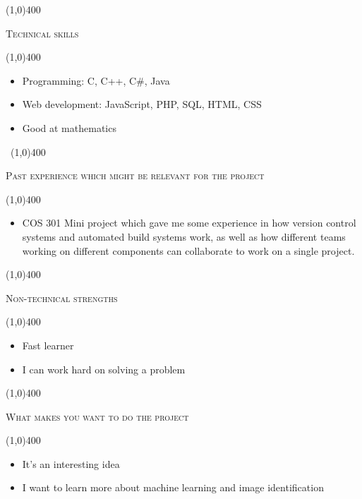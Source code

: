 \documentclass[12pt,a4paper]{report}
\begin{document}
	\begin{center}
	
	\line(1,0){400}\\
	{\scshape\large Technical skills\par}
	\line(1,0){400}\\
	\end{center}
		\begin{itemize}
\item Programming: C, C++, C\#, Java
\item Web development: JavaScript, PHP, SQL, HTML, CSS
\item Good at mathematics
\end{itemize}
\newpage
\begin{center}
	\vspace*{-3cm}\
	\line(1,0){400}\\
	{\scshape\large Past experience which might be relevant for the project\par}
	\line(1,0){400}\\
	\end{center}
		\begin{itemize}
\item COS 301 Mini project which gave me some experience in how version control
systems and automated build systems work, as well as how different teams working
on different components can collaborate to work on a single project.
\end{itemize}

	\begin{center}
	
	\line(1,0){400}\\
	{\scshape\large Non-technical strengths\par}
	\line(1,0){400}\\
	\end{center}
		\begin{itemize}
\item Fast learner
\item I can work hard on solving a problem
\end{itemize}

\begin{center}
	
	\line(1,0){400}\\
	{\scshape\large What makes you want to do the project\par}
	\line(1,0){400}\\
	\end{center}
		\begin{itemize}
\item It's an interesting idea
\item I want to learn more about machine learning and image identification
\end{itemize}
\end{document}
